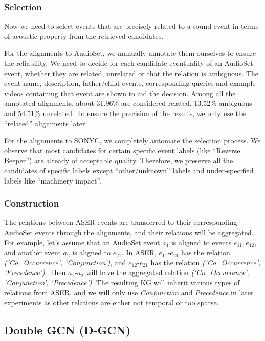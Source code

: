 \subsubsection{Selection} 

Now we need to select events that are precisely related to a sound event in terms of acoustic property from the retrieved candidates. 

For the alignments to AudioSet, we manually annotate them ourselves to ensure the reliability. We need to decide for each candidate eventuality of an AudioSet event, whether they are related, unrelated or that the relation is ambiguous. The event name, description, father/child events, corresponding queries and example videos containing that event are shown to aid the decision. Among all the annotated alignments, about 31.96\% are considered related, 13.52\% ambiguous and 54.51\% unrelated. To ensure the precision of the results, we only use the ``related'' alignments later.

For the alignments to SONYC, we completely automate the selection process. We observe that
most candidates for certain specific event labels (like ``Reverse Beeper'') are already of acceptable quality. Therefore, we preserve all the candidates of specific labels except ``other/unknown'' labels and under-specified labels like ``machinery impact''. %

\subsubsection{Construction}

The relations between ASER events are transferred to their corresponding AudioSet events through the alignments, and their relations will be aggregated. For example, let's assume that an AudioSet event $a_1$ is aligned to events $e_{11}, e_{12}$, and another event $a_2$ is aligned to $e_{21}$. In ASER, $e_{11}$-$e_{21}$ has the relation \textit{(`Co\_Occurrence', `Conjunction')}, and $e_{12}$-$e_{21}$ has the relation \textit{(`Co\_Occurrence', `Precedence')}. Then $a_1$-$a_2$ will have the aggregated relation \textit{(`Co\_Occurrence', `Conjunction', `Precedence')}. The resulting KG will inherit various types of relations from ASER, and we will only use \textit{Conjunction} and \textit{Precedence} in later experiments as other relations are either not temporal or too sparse.
\subsection{Double GCN (D-GCN)}

